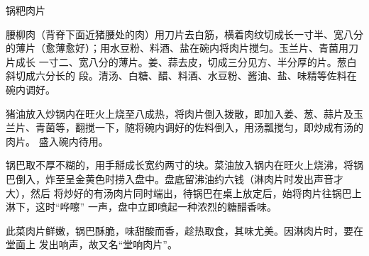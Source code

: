 \begin{recipe}{锅粑肉片}

\ingredients


\preparation

\step 腰柳肉（背脊下面近猪腰处的肉）用刀片去白筋，横着肉纹切成长一寸半、宽八分
的薄片（愈薄愈好）；用水豆粉、料酒、盐在碗内将肉片搅匀。玉兰片、青菌用刀片成长
一寸二、宽八分的薄片。姜、蒜去皮，切成三分见方、半分厚的片。葱白斜切成六分长的
段。清汤、白糖、醋、料酒、水豆粉、酱油、盐、味精等佐料在碗内调好。

\step 猪油放入炒锅内在旺火上烧至八成热，将肉片倒入拨散，即加入姜、葱、蒜片及玉
兰片、青菌等，翻搅一下，随将碗内调好的佐料倒入，用汤瓢搅匀，即炒成有汤的肉片。
盛入碗内待用。

\step 锅巴取不厚不糊的，用手掰成长宽约两寸的块。菜油放入锅内在旺火上烧沸，将锅
巴倒入，炸至呈金黄色时捞入盘中。盘底留沸油约六钱（淋肉片时发出声音才大），然后
将炒好的有汤肉片同时端出，待锅巴在桌上放定后，始将肉片往锅巴上淋下，这时“哗嚓”
一声，盘中立即喷起一种浓烈的糖醋香味。

\features

此菜肉片鲜嫩，锅巴酥脆，味甜酸而香，趁热取食，其味尤美。因淋肉片时，要在堂面上
发出响声，故又名“堂响肉片”。

\end{recipe}

